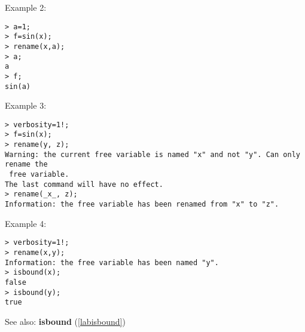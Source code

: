 \noindent Example 2: 
\begin{center}\begin{minipage}{15cm}\begin{Verbatim}[frame=single,commandchars=\\\|\~]
> a=1;
> f=sin(x);
> rename(x,a);
> a;
a
> f;
sin(a)
\end{Verbatim}
\end{minipage}\end{center}
\noindent Example 3: 
\begin{center}\begin{minipage}{15cm}\begin{Verbatim}[frame=single,commandchars=\\\|\~]
> verbosity=1!;
> f=sin(x);
> rename(y, z);
Warning: the current free variable is named "x" and not "y". Can only rename the
 free variable.
The last command will have no effect.
> rename(_x_, z);
Information: the free variable has been renamed from "x" to "z".
\end{Verbatim}
\end{minipage}\end{center}
\noindent Example 4: 
\begin{center}\begin{minipage}{15cm}\begin{Verbatim}[frame=single,commandchars=\\\|\~]
> verbosity=1!;
> rename(x,y);
Information: the free variable has been named "y".
> isbound(x);
false
> isbound(y);
true
\end{Verbatim}
\end{minipage}\end{center}
See also: \textbf{isbound} (\ref{labisbound})
